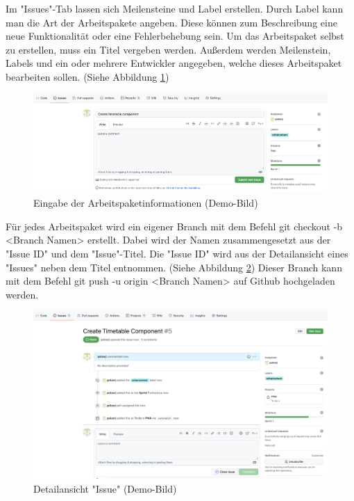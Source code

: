 
Im "Issues"-Tab lassen sich Meilensteine und Label erstellen. Durch Label kann man die Art der Arbeitspakete angeben. Diese können zum Beschreibung eine neue Funktionalität oder eine Fehlerbehebung sein. Um das Arbeitspaket selbst zu erstellen, muss ein Titel vergeben werden. Außerdem werden Meilenstein, Labels und ein oder mehrere Entwickler angegeben, welche dieses Arbeitspaket bearbeiten sollen. (Siehe Abbildung \ref{fig:createIssue})

\begin{figure}[H]
    \centering
    \includegraphics[width=\textwidth]{media/ProjectManagement/CreateIssue.png}
    \caption{Eingabe der Arbeitspaketinformationen (Demo-Bild)}
    \label{fig:createIssue}
\end{figure}


Für jedes Arbeitspaket wird ein eigener Branch mit dem Befehl {\ttfamily git checkout -b <Branch Namen>} erstellt. Dabei wird der Namen zusammengesetzt aus der "Issue ID" und dem "Issue"-Titel. Die "Issue ID" wird aus der Detailansicht eines "Issues" neben dem Titel entnommen. (Siehe Abbildung \ref{fig:issueInfo})  Dieser Branch kann mit dem Befehl {\ttfamily git push -u origin <Branch Namen>} auf Github hochgeladen werden. 

\begin{figure}[H]
    \centering
    \includegraphics[width=\textwidth]{media/ProjectManagement/IssueInfo.png}
    \caption{Detailansicht "Issue" (Demo-Bild)}
    \label{fig:issueInfo}
\end{figure}

